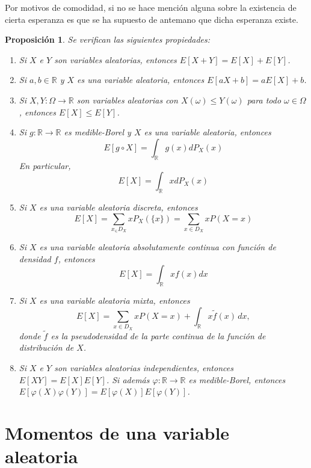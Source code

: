 \documentclass[11pt]{report}
\theoremstyle{mytheorem}
\newtheorem{proposition}{Proposición}
\theoremstyle{mydefinition}
\theoremstyle{myexample}
\newenvironment{cproposition} %
  {\begin{mdframed}[
        linewidth=3pt,
        linecolor=c2,
        bottomline=false,
        topline=false,
        rightline=false,
        innerrightmargin=0pt,
        innertopmargin=0pt,
        innerbottommargin=0pt,
        innerleftmargin=1em,
        skipabove=\baselineskip]
    \begin{proposition}}
  {\end{proposition}\end{mdframed}}
\newcommand{\R}{\mathbb R}
\begin{document}
Por motivos de comodidad, si no se hace mención alguna sobre la existencia de cierta esperanza es que se ha supuesto de antemano que dicha esperanza existe.

\begin{cproposition}
Se verifican las siguientes propiedades:
\begin{enumerate}
    \item Si $X$ e $Y$ son variables aleatorias, entonces $E[X+Y] = E[X]+E[Y]$.
    \item Si $a,b \in \R$ y $X$ es una variable aleatoria, entonces  $E[aX+b] = aE[X]+b$.
    \item Si $X,Y \colon \Omega \to \R$ son variables aleatorias con $X(\omega) \leq Y(\omega)$ para todo $\omega \in \Omega$, entonces $E[X] \leq E[Y]$.
    \item Si $g \colon \R \to \R$ es medible-Borel y $X$ es una variable aleatoria, entonces
    \[E[g \circ X] = \int_\R g(x)dP_X(x)\]
    En particular,
    \[E[X] = \int_\R xdP_X(x)\]
    \item Si $X$ es una variable aleatoria discreta, entonces
    \[E[X] =\sum_{x_ \in D_X}xP_X(\{x\})=\sum_{x \in D_X}xP(X=x)\]
    \item Si $X$ es una variable aleatoria absolutamente continua con función de densidad $f$, entonces
    \[E[X] = \int_\R xf(x)dx\]
    \item Si $X$ es una variable aleatoria mixta, entonces
    \[E[X]=\sum_{x \in D_X}xP(X=x)+\int_\R x\tilde{f}(x)\, dx,\]
    donde $\tilde{f}$ es la pseudodensidad de la parte continua de la función de distribución de $X$.
    \item Si $X$ e $Y$ son variables aleatorias independientes, entonces $E[XY] = E[X]E[Y]$. Si además $\varphi \colon \R \to \R$ es medible-Borel, entonces $E[\varphi (X)\varphi(Y)] = E[\varphi(X)]E[\varphi(Y)]$.
\end{enumerate}
\end{cproposition}

\section{Momentos de una variable aleatoria}
\end{document}
